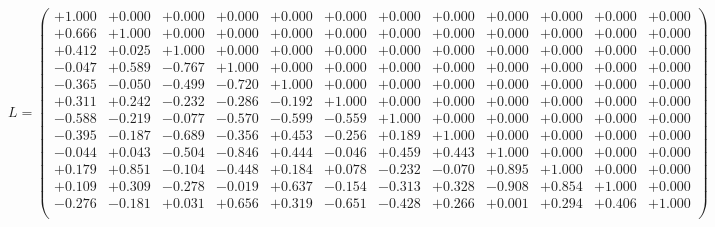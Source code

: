 \documentclass[9pt]{article}
\theoremstyle{plain}
\theoremstyle{definition}
\theoremstyle{remark}
\numberwithin{equation}{section}
\begin{document}
$L = \left(
\begin{array}{
cccccccccccc}
+1.000 & +0.000 & +0.000 & +0.000 & +0.000 & +0.000 & +0.000 & +0.000 & +0.000 & +0.000 & +0.000 & +0.000 \\
+0.666 & +1.000 & +0.000 & +0.000 & +0.000 & +0.000 & +0.000 & +0.000 & +0.000 & +0.000 & +0.000 & +0.000 \\
+0.412 & +0.025 & +1.000 & +0.000 & +0.000 & +0.000 & +0.000 & +0.000 & +0.000 & +0.000 & +0.000 & +0.000 \\
-0.047 & +0.589 & -0.767 & +1.000 & +0.000 & +0.000 & +0.000 & +0.000 & +0.000 & +0.000 & +0.000 & +0.000 \\
-0.365 & -0.050 & -0.499 & -0.720 & +1.000 & +0.000 & +0.000 & +0.000 & +0.000 & +0.000 & +0.000 & +0.000 \\
+0.311 & +0.242 & -0.232 & -0.286 & -0.192 & +1.000 & +0.000 & +0.000 & +0.000 & +0.000 & +0.000 & +0.000 \\
-0.588 & -0.219 & -0.077 & -0.570 & -0.599 & -0.559 & +1.000 & +0.000 & +0.000 & +0.000 & +0.000 & +0.000 \\
-0.395 & -0.187 & -0.689 & -0.356 & +0.453 & -0.256 & +0.189 & +1.000 & +0.000 & +0.000 & +0.000 & +0.000 \\
-0.044 & +0.043 & -0.504 & -0.846 & +0.444 & -0.046 & +0.459 & +0.443 & +1.000 & +0.000 & +0.000 & +0.000 \\
+0.179 & +0.851 & -0.104 & -0.448 & +0.184 & +0.078 & -0.232 & -0.070 & +0.895 & +1.000 & +0.000 & +0.000 \\
+0.109 & +0.309 & -0.278 & -0.019 & +0.637 & -0.154 & -0.313 & +0.328 & -0.908 & +0.854 & +1.000 & +0.000 \\
-0.276 & -0.181 & +0.031 & +0.656 & +0.319 & -0.651 & -0.428 & +0.266 & +0.001 & +0.294 & +0.406 & +1.000 \\
\end{array}
\right)$ \newline 
\end{document}
